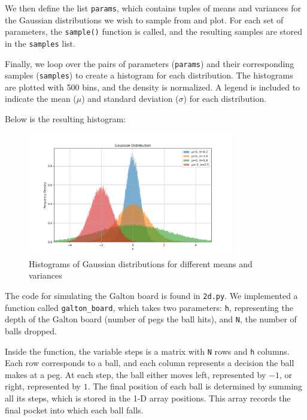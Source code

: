 \begin{solution}
	We then define the list \texttt{params}, which contains tuples of means and variances for the Gaussian distributions we wish to sample from and plot. For each set of parameters, the \texttt{sample()} function is called, and the resulting samples are stored in the \texttt{samples} list.

	Finally, we loop over the pairs of parameters (\texttt{params}) and their corresponding samples (\texttt{samples}) to create a histogram for each distribution. The histograms are plotted with 500 bins, and the density is normalized. A legend is included to indicate the mean (\texttt{$\mu$}) and standard deviation (\texttt{$\sigma$}) for each distribution.

	Below is the resulting histogram:
	\begin{figure}[H]
		\centering
		\includegraphics[width=0.8\textwidth]{../images/2c.png}
		\caption{Histograms of Gaussian distributions for different means and variances}
		\label{fig:gaussian_hist}
	\end{figure}
	
	The code for simulating the Galton board is found in \texttt{2d.py}. We implemented a function called \texttt{galton\_board}, which takes two parameters: \texttt{h}, representing the depth of the Galton board (number of pegs the ball hits), and \texttt{N}, the number of balls dropped.

Inside the function, the variable steps is a matrix with \texttt{N} rows and \texttt{h} columns. Each row corresponds to a ball, and each column represents a decision the ball makes at a peg. At each step, the ball either moves left, represented by $-1$, or right, represented by $1$. The final position of each ball is determined by summing all its steps, which is stored in the 1-D array positions. This array records the final pocket into which each ball falls.


\end{solution}
